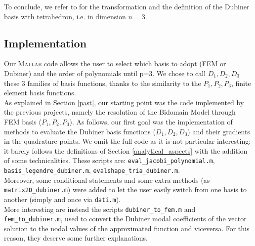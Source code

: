 \documentclass[a4paper,11pt]{article}
\begin{document}
    \noindent To conclude, we refer to \cite{sherwin} for the transformation and the definition of the Dubiner basis with tetrahedron, i.e. in dimension $n=3$.
    
    \subsection{Implementation}
    Our \textsc{Matlab} code allows the user to select which basis to adopt (FEM or Dubiner) and the order of polynomials until p=3. We chose to call $D_1,D_2,D_3$ these 3 families of basis functions, thanks to the similarity to the $P_1,P_2,P_3$, finite element basis functions.\\
    As explained in Section \ref{past}, our starting point was the code implemented by the previous projects, namely the resolution of the Bidomain Model through FEM basis ($P_1,P_2,P_3$). As follows, our first goal was the implementation of methods to evaluate the Dubiner basis functions ($D_1,D_2,D_3$) and their gradients in the quadrature points. We omit the full code as it is not particular interesting: it barely follows the definitions of Section \ref{analytical_aspects} with the addition of some technicalities. These scripts are: \texttt{eval\_jacobi\_polynomial.m}, \texttt{basis\_legendre\_dubiner.m}, \texttt{evalshape\_tria\_dubiner.m}.\\
    
    \noindent Moreover, some conditional statements and some extra methods (as \texttt{matrix2D\_dubiner.m}) were added to let the user easily switch from one basis to another (simply and once via \texttt{dati.m}). \\
    
    \noindent More interesting are instead the scripts \texttt{dubiner\_to\_fem.m} and \texttt{fem\_to\_dubiner.m}, used to convert the Dubiner modal coefficients of the vector solution to the nodal values of the approximated function and viceversa. For this reason, they deserve some further explanations.
\end{document}
